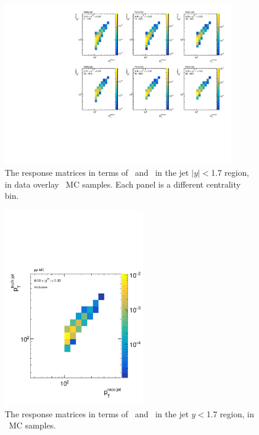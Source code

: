 \begin{figure}
\centering
\includegraphics[page=5, width=0.9\textwidth]{figures/main/corrections/resp_matrix_jet_PbPb_MC.pdf}
\caption{The response matrices in terms of \ptjetreco\ and \ptjettruth\ in the jet $|y| < $1.7 region, in data overlay \pbpb\ MC samples.
Each panel is a different centrality bin.}
\label{fig:PbPb_jetspect_respmatrix}
\end{figure}

\begin{figure}
\centering
\includegraphics[page=5, width=0.55\textwidth]{figures/main/corrections/resp_matrix_jet_pp_MC.pdf}
\caption{The response matrices in terms of \ptjetreco\ and \ptjettruth\ in the jet $y < $1.7 region, in \pp\ MC samples.}
\label{fig:pp_jetspect_respmatrix}
\end{figure}

